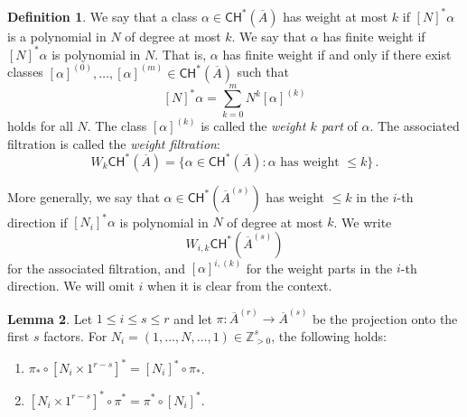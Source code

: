 \documentclass[11pt]{article}
\def\CH{\mathsf{CH}}
\def\ZZ{\mathbb{Z}}
\newcommand{\barA}{\overline{A}}
\theoremstyle{definition}
\newtheorem{definition}{Definition}[section]
\newtheorem{lemma}[definition]{Lemma}
\begin{document}
\begin{definition}
    We say that a class $\alpha \in \CH^*(\barA)$ has weight at most $k$ if $[N]^*\alpha$ is a polynomial in $N$ of degree at most $k$.
    We say that $\alpha$ has finite weight if $[N]^*\alpha$ is polynomial in $N$. That is, $\alpha$ has finite weight if and only if
	there exist classes $[\alpha]^{(0)},\dots,[\alpha]^{(m)}\in\CH^{\ast}(\barA)$ such that
    $$
    [N]^*\alpha = \sum_{k=0}^m N^k [\alpha]^{(k)}
    $$
	holds for all $N$. The class $[\alpha]^{(k)}$ is called the \emph{weight $k$ part} of $\alpha$. The associated filtration is called
	the \emph{weight filtration}:
    $$
    W_k \CH^*(\barA) = \{\alpha \in \CH^*(\barA) : \alpha\text{ has weight } \leq k\}\,.
    $$
\end{definition}

More generally, we say that $\alpha\in \CH^*(\barA^{(s)})$ has weight $ \leq k$ in the $i$-th direction if $[N_i]^*\alpha$ is polynomial in $N$ of degree at most $k$. We write
    $$
    W_{i,k}\CH^*(\barA^{(s)})
    $$
for the associated filtration, and $[\alpha]^{i, (k)}$ for the weight parts in the $i$-th direction. We will omit $i$ when it is clear from the context.

\begin{lemma}\label{lem:Npush}
    Let $1 \leq i\leq s \leq r$ and let $\pi : \barA^{(r)} \to \barA^{(s)}$ be the projection onto the first $s$ factors. For $N_i = (1, \ldots , N, \ldots , 1) \in \ZZ^s_{>0}$, the following holds:
    \begin{enumerate}[label = (\alph*)]
        \item $\pi_{*}\circ [N_i\times 1^{r-s}]^* = [N_i]^*\circ \pi_*$.
        \item $[N_i\times 1^{r-s}]^* \circ \pi^* = \pi^* \circ [N_i]^*$.
    \end{enumerate}
\end{lemma}
\end{document}
